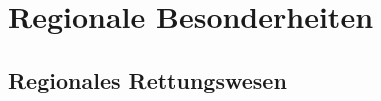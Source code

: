 \def\ChapterCode{REG}
\chapter
[\CO{[REG]} Regionale Besonderheiten]
{Regionale Besonderheiten}
\label{chp:REG}


\section{Regionales Rettungswesen}


\ChapterEnd

